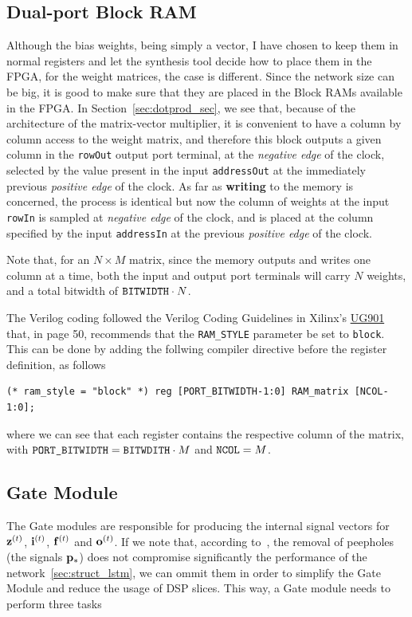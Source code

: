 \subsection{Dual-port Block RAM}
Although the bias weights, being simply a vector, I have chosen to keep them in normal registers and let the synthesis tool decide how to place them in the FPGA, for the weight matrices, the case is different. Since the
network size can be big, it is good to make sure that they are placed in the Block RAMs available in the FPGA. In Section~\ref{sec:dotprod_sec}, we see that, because of the architecture of the matrix-vector multiplier, it is convenient to have a column by column access to the weight matrix, and therefore this block outputs a given column in the \verb+rowOut+ output port terminal, at the \emph{negative edge} of the clock, selected by the value present in the input \verb+addressOut+ at the immediately previous \emph{positive edge} of the clock. As far as \textbf{writing} to the memory is concerned, the process is identical but now the column of weights at the input \verb+rowIn+ is sampled at \emph{negative edge} of the clock, and is placed at the column specified by the input \verb+addressIn+ at the previous \emph{positive edge} of the clock. 

Note that, for an $N \times M$ matrix, since the memory outputs and writes one column at a time, both the input and output port terminals will carry $N$ weights, and a total bitwidth of $\verb+BITWIDTH+ \cdot N$. 

The Verilog coding followed the Verilog Coding Guidelines in Xilinx's \href{http://www.xilinx.com/support/documentation/sw_manuals/xilinx2015_2/ug901-vivado-synthesis.pdf}{UG901} that, in page 50, recommends that the \verb+RAM_STYLE+ parameter be set to \verb+block+. This can be done by adding the follwing compiler directive before the register definition, as follows

\begin{verbatim}
(* ram_style = "block" *) reg [PORT_BITWIDTH-1:0] RAM_matrix [NCOL-1:0];
\end{verbatim}
where we can see that each register contains the respective column of the matrix, with $\verb+PORT_BITWIDTH+ = \verb+BITWDITH+ \cdot M$ and $\verb+NCOL+ = M$.
 

\subsection{Gate Module}\label{sec:gatemod} 
The Gate modules are responsible for producing the internal signal vectors for $\mathbf{z}^{(t)}$, $\mathbf{i}^{(t)}$, $\mathbf{f}^{(t)}$ and $\mathbf{o}^{(t)}$. If we note that, according to~\cite{Greff15}, the removal of peepholes (the signals $\mathbf{p}_*$) does not compromise significantly the performance of the network~\ref{sec:struct_lstm}, we can ommit them in order to simplify the Gate Module and reduce the usage of DSP slices. This way, a Gate module needs to perform three tasks

